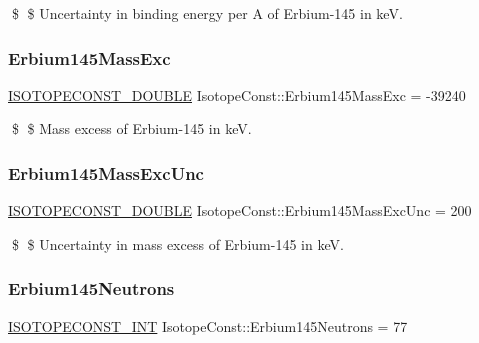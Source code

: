 \$ \$ Uncertainty in binding energy per A of Erbium-\/145 in keV. \mbox{\label{group___isotope_const-_erbium-_er145_ga84a7ac75853e876ee48e97b9265e0a44}} 
\subsubsection{\texorpdfstring{Erbium145\+Mass\+Exc}{Erbium145MassExc}}
{\footnotesize\ttfamily \mbox{\hyperlink{group___isotope_const-_macros_ga8f45a7272ce02c0b4c65c44636ed719a}{I\+S\+O\+T\+O\+P\+E\+C\+O\+N\+S\+T\+\_\+\+D\+O\+U\+B\+LE}} Isotope\+Const\+::\+Erbium145\+Mass\+Exc = -\/39240}

\$ \$ Mass excess of Erbium-\/145 in keV. \mbox{\label{group___isotope_const-_erbium-_er145_ga0356fba029cb103c03a1371b5e48fdf1}} 
\subsubsection{\texorpdfstring{Erbium145\+Mass\+Exc\+Unc}{Erbium145MassExcUnc}}
{\footnotesize\ttfamily \mbox{\hyperlink{group___isotope_const-_macros_ga8f45a7272ce02c0b4c65c44636ed719a}{I\+S\+O\+T\+O\+P\+E\+C\+O\+N\+S\+T\+\_\+\+D\+O\+U\+B\+LE}} Isotope\+Const\+::\+Erbium145\+Mass\+Exc\+Unc = 200}

\$ \$ Uncertainty in mass excess of Erbium-\/145 in keV. \mbox{\label{group___isotope_const-_erbium-_er145_ga94735b6515ba8580a8c33f1967e06854}} 
\subsubsection{\texorpdfstring{Erbium145\+Neutrons}{Erbium145Neutrons}}
{\footnotesize\ttfamily \mbox{\hyperlink{group___isotope_const-_macros_ga5f18360b3e99483a35c32d789e62621c}{I\+S\+O\+T\+O\+P\+E\+C\+O\+N\+S\+T\+\_\+\+I\+NT}} Isotope\+Const\+::\+Erbium145\+Neutrons = 77}


